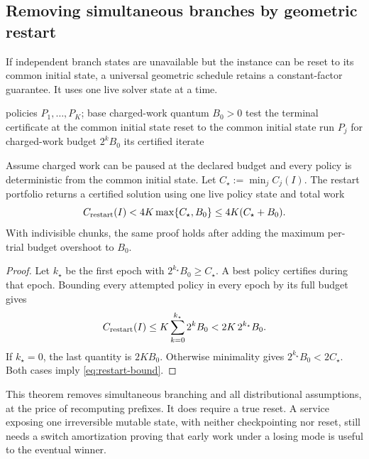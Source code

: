 \subsection{Removing simultaneous branches by geometric restart}

If independent branch states are unavailable but the instance can be reset
to its common initial state, a universal geometric schedule retains a
constant-factor guarantee.  It uses one live solver state at a time.

\begin{algorithm}[H]
\caption{Single-live-state restart portfolio}
\begin{algorithmic}[1]
\REQUIRE policies $P_1,\ldots,P_K$; base charged-work quantum $B_0>0$
\STATE test the terminal certificate at the common initial state
    \STATE reset to the common initial state
    \STATE run $P_j$ for charged-work budget $2^kB_0$
      \RETURN its certified iterate
    \ENDIF
  \ENDFOR
\ENDFOR
\end{algorithmic}
\end{algorithm}

\begin{theorem}
\label{thm:restart-portfolio}
Assume charged work can be paused at the declared budget and every policy is
deterministic from the common initial state.  Let
$C_\star:=\min_j C_j(I)$.  The restart portfolio returns a certified solution
using one live policy state and total work
\begin{equation}
 C_{\rm restart}(I)<4K\max\{C_\star,B_0\}
 \leq4K(C_\star+B_0).
 \label{eq:restart-bound}
\end{equation}
With indivisible chunks, the same proof holds after adding the maximum
per-trial budget overshoot to $B_0$.
\end{theorem}

\begin{proof}
Let $k_\star$ be the first epoch with
$2^{k_\star}B_0\geq C_\star$.
A best policy certifies during that epoch.  Bounding every attempted policy
in every epoch by its full budget gives
\[
 C_{\rm restart}(I)
 \leq K\sum_{k=0}^{k_\star}2^kB_0
 <2K\,2^{k_\star}B_0.
\]
If $k_\star=0$, the last quantity is $2KB_0$.  Otherwise minimality gives
$2^{k_\star}B_0<2C_\star$.  Both cases imply
\eqref{eq:restart-bound}.
\end{proof}

This theorem removes simultaneous branching and all distributional
assumptions, at the price of recomputing prefixes.  It does require a true
reset.  A service exposing one irreversible mutable state, with neither
checkpointing nor reset, still needs a switch amortization proving that early
work under a losing mode is useful to the eventual winner.
